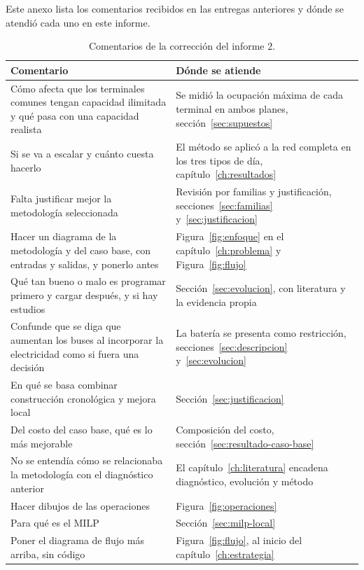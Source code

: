 Este anexo lista los comentarios recibidos en las entregas anteriores y dónde se atendió cada uno en este informe.

\begin{table}[H]
\centering
\caption{Comentarios de la corrección del informe 2.}
\label{tab:corr-informe2}
\footnotesize
\begin{tabularx}{\textwidth}{@{}X p{5.2cm}@{}}
\toprule
Comentario & Dónde se atiende \\
\midrule
Cómo afecta que los terminales comunes tengan capacidad ilimitada y qué pasa con una capacidad realista & Se midió la ocupación máxima de cada terminal en ambos planes, sección~\ref{sec:supuestos} \\
Si se va a escalar y cuánto cuesta hacerlo & El método se aplicó a la red completa en los tres tipos de día, capítulo~\ref{ch:resultados} \\
Falta justificar mejor la metodología seleccionada & Revisión por familias y justificación, secciones~\ref{sec:familias} y~\ref{sec:justificacion} \\
Hacer un diagrama de la metodología y del caso base, con entradas y salidas, y ponerlo antes & Figura~\ref{fig:enfoque} en el capítulo~\ref{ch:problema} y Figura~\ref{fig:flujo} \\
Qué tan bueno o malo es programar primero y cargar después, y si hay estudios & Sección~\ref{sec:evolucion}, con literatura y la evidencia propia \\
Confunde que se diga que aumentan los buses al incorporar la electricidad como si fuera una decisión & La batería se presenta como restricción, secciones~\ref{sec:descripcion} y~\ref{sec:evolucion} \\
En qué se basa combinar construcción cronológica y mejora local & Sección~\ref{sec:justificacion} \\
Del costo del caso base, qué es lo más mejorable & Composición del costo, sección~\ref{sec:resultado-caso-base} \\
No se entendía cómo se relacionaba la metodología con el diagnóstico anterior & El capítulo~\ref{ch:literatura} encadena diagnóstico, evolución y método \\
Hacer dibujos de las operaciones & Figura~\ref{fig:operaciones} \\
Para qué es el MILP & Sección~\ref{sec:milp-local} \\
Poner el diagrama de flujo más arriba, sin código & Figura~\ref{fig:flujo}, al inicio del capítulo~\ref{ch:estrategia} \\
\bottomrule
\end{tabularx}
\end{table}

